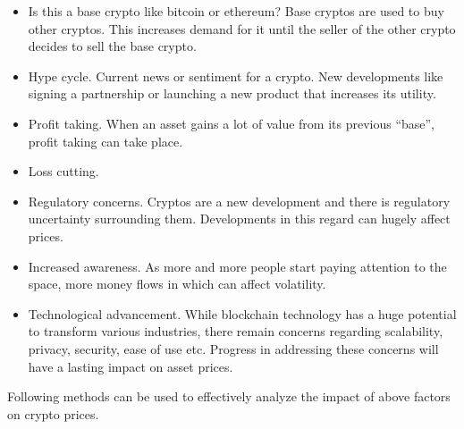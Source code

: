 \documentclass[a4paper]{article}
\begin{document}
\begin{itemize}
	\item Is this a base crypto like bitcoin or ethereum? Base cryptos are used to buy other cryptos. This increases demand for it until the seller of the other crypto decides to sell the base crypto.
	\item Hype cycle. Current news or sentiment for a crypto. New developments like signing a partnership or launching a new product that increases its utility. 
	\item Profit taking. When an asset gains a lot of value from its previous “base”, profit taking can take place.
	\item Loss cutting.
	\item Regulatory concerns. Cryptos are a new development and there is regulatory uncertainty surrounding them. Developments in this regard can hugely affect prices.
	\item Increased awareness. As more and more people start paying attention to the space, more money flows in which can affect volatility.
	\item Technological advancement. While blockchain technology has a huge potential to transform various industries, there remain concerns regarding scalability, privacy, security, ease of use etc. Progress in 	addressing these concerns will have a lasting impact on asset prices.
\end{itemize}
Following methods can be used to effectively analyze the impact of above factors on crypto prices.
\end{document}
